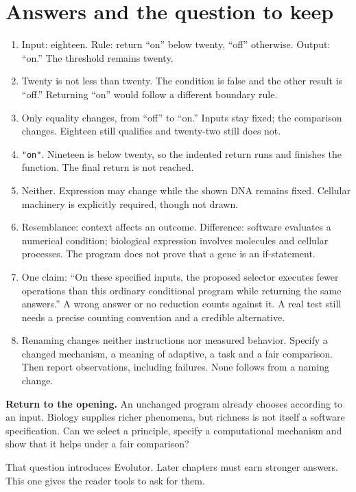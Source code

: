 \section{Answers and the question to keep}\label{sec:answers}
\begin{enumerate}
\item Input: eighteen. Rule: return “on” below twenty, “off” otherwise. Output: “on.” The threshold remains twenty.
\item Twenty is not less than twenty. The condition is false and the other result is “off.” Returning “on” would follow a different boundary rule.
\item Only equality changes, from “off” to “on.” Inputs stay fixed; the comparison changes. Eighteen still qualifies and twenty-two still does not.
\item \texttt{"on"}. Nineteen is below twenty, so the indented return runs and finishes the function. The final return is not reached.
\item Neither. Expression may change while the shown DNA remains fixed. Cellular machinery is explicitly required, though not drawn.
\item Resemblance: context affects an outcome. Difference: software evaluates a numerical condition; biological expression involves molecules and cellular processes. The program does not prove that a gene is an if-statement.
\item One claim: “On these specified inputs, the proposed selector executes fewer operations than this ordinary conditional program while returning the same answers.” A wrong answer or no reduction counts against it. A real test still needs a precise counting convention and a credible alternative.
\item Renaming changes neither instructions nor measured behavior. Specify a changed mechanism, a meaning of adaptive, a task and a fair comparison. Then report observations, including failures. None follows from a naming change.
\end{enumerate}
\textbf{Return to the opening.} An unchanged program already chooses according to an input. Biology supplies richer phenomena, but richness is not itself a software specification. Can we select a principle, specify a computational mechanism and show that it helps under a fair comparison?

That question introduces Evolutor. Later chapters must earn stronger answers. This one gives the reader tools to ask for them.
